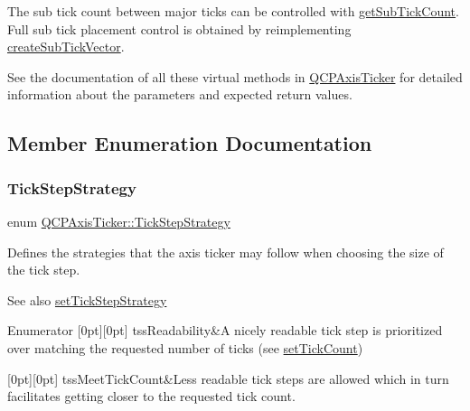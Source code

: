 The sub tick count between major ticks can be controlled with \mbox{\hyperlink{class_q_c_p_axis_ticker_a4ccc403ced7a1457ce6ba293509933c8}{get\+Sub\+Tick\+Count}}. Full sub tick placement control is obtained by reimplementing \mbox{\hyperlink{class_q_c_p_axis_ticker_a9a6435723fa0bd366d1ea4c2cff7c33f}{create\+Sub\+Tick\+Vector}}.

See the documentation of all these virtual methods in \mbox{\hyperlink{class_q_c_p_axis_ticker}{Q\+C\+P\+Axis\+Ticker}} for detailed information about the parameters and expected return values. 

\subsection{Member Enumeration Documentation}
\mbox{\label{class_q_c_p_axis_ticker_ab6d2f9d9477821623ac9bc4b21ddf49a}} 
\subsubsection{\texorpdfstring{TickStepStrategy}{TickStepStrategy}}
{\footnotesize\ttfamily enum \mbox{\hyperlink{class_q_c_p_axis_ticker_ab6d2f9d9477821623ac9bc4b21ddf49a}{Q\+C\+P\+Axis\+Ticker\+::\+Tick\+Step\+Strategy}}}

Defines the strategies that the axis ticker may follow when choosing the size of the tick step.

\begin{DoxySeeAlso}{See also}
\mbox{\hyperlink{class_q_c_p_axis_ticker_a73b1d847c1a12159af6bfda4ebebe7d5}{set\+Tick\+Step\+Strategy}} 
\end{DoxySeeAlso}
\begin{DoxyEnumFields}{Enumerator}
[0pt][0pt]{}\mbox{\label{class_q_c_p_axis_ticker_ab6d2f9d9477821623ac9bc4b21ddf49aa9002aa2fd5633ab5556c71a26fed63a8}} 
tss\+Readability&A nicely readable tick step is prioritized over matching the requested number of ticks (see \mbox{\hyperlink{class_q_c_p_axis_ticker_a47752abba8293e6dc18491501ae34008}{set\+Tick\+Count}}) \\
\hline

[0pt][0pt]{}\mbox{\label{class_q_c_p_axis_ticker_ab6d2f9d9477821623ac9bc4b21ddf49aa770312b6b9b0c64a37ceeba96e0cd7f2}} 
tss\+Meet\+Tick\+Count&Less readable tick steps are allowed which in turn facilitates getting closer to the requested tick count. \\
\hline

\end{DoxyEnumFields}


